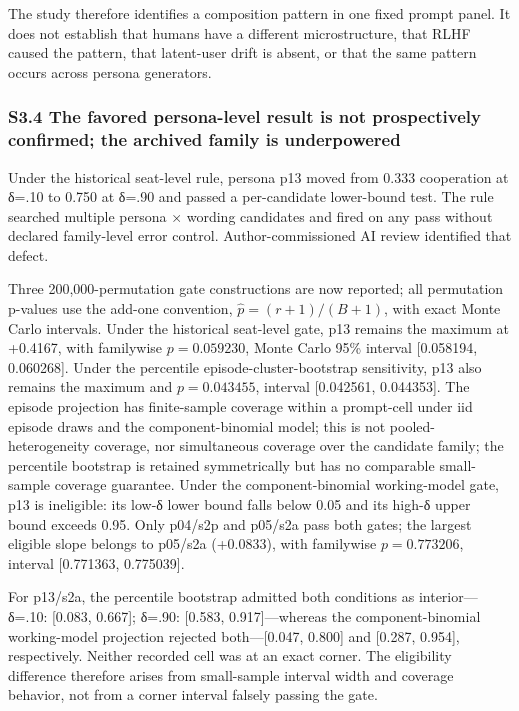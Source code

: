 \documentclass[11pt]{article}
\begin{document}
The study therefore identifies a composition pattern in one fixed prompt
panel. It does not establish that humans have a different
microstructure, that RLHF caused the pattern, that latent-user drift is
absent, or that the same pattern occurs across persona generators.

\subsubsection{S3.4 The favored persona-level result is not
prospectively confirmed; the archived family is
underpowered}\label{s3.4-the-favored-persona-level-result-is-not-prospectively-confirmed-the-archived-family-is-underpowered}

Under the historical seat-level rule, persona p13 moved from 0.333
cooperation at δ=.10 to 0.750 at δ=.90 and passed a per-candidate
lower-bound test. The rule searched multiple persona × wording
candidates and fired on any pass without declared family-level error
control. Author-commissioned AI review identified that defect.

Three 200,000-permutation gate constructions are now reported; all
permutation p-values use the add-one convention,
\(\widehat p=(r+1)/(B+1)\), with exact Monte Carlo intervals. Under the
historical seat-level gate, p13 remains the maximum at +0.4167, with
familywise \(p=0.059230\), Monte Carlo 95\% interval {[}0.058194,
0.060268{]}. Under the percentile episode-cluster-bootstrap sensitivity,
p13 also remains the maximum and \(p=0.043455\), interval {[}0.042561,
0.044353{]}. The episode projection has finite-sample coverage within a
prompt-cell under iid episode draws and the component-binomial model;
this is not pooled-heterogeneity coverage, nor simultaneous coverage
over the candidate family; the percentile bootstrap is retained
symmetrically but has no comparable small-sample coverage guarantee.
Under the component-binomial working-model gate, p13 is ineligible: its
low-δ lower bound falls below 0.05 and its high-δ upper bound exceeds
0.95. Only p04/s2p and p05/s2a pass both gates; the largest eligible
slope belongs to p05/s2a (+0.0833), with familywise \(p=0.773206\),
interval {[}0.771363, 0.775039{]}.

For p13/s2a, the percentile bootstrap admitted both conditions as
interior---δ=.10: {[}0.083, 0.667{]}; δ=.90: {[}0.583,
0.917{]}---whereas the component-binomial working-model projection
rejected both---{[}0.047, 0.800{]} and {[}0.287, 0.954{]}, respectively.
Neither recorded cell was at an exact corner. The eligibility difference
therefore arises from small-sample interval width and coverage behavior,
not from a corner interval falsely passing the gate.
\end{document}
